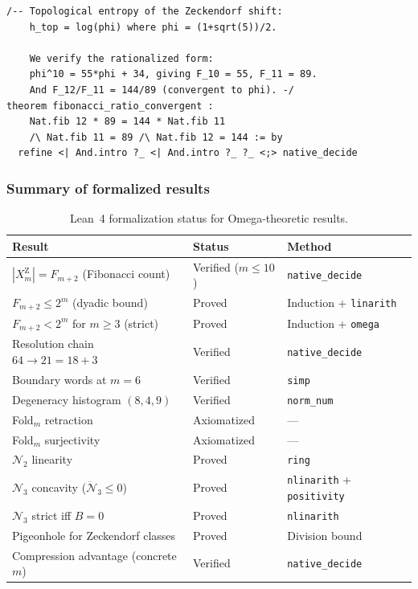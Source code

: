 \begin{lstlisting}[language=Lean4,caption={Q6 pigeonhole and compression verification}]
/-- Topological entropy of the Zeckendorf shift:
    h_top = log(phi) where phi = (1+sqrt(5))/2.

    We verify the rationalized form:
    phi^10 = 55*phi + 34, giving F_10 = 55, F_11 = 89.
    And F_12/F_11 = 144/89 (convergent to phi). -/
theorem fibonacci_ratio_convergent :
    Nat.fib 12 * 89 = 144 * Nat.fib 11
    /\ Nat.fib 11 = 89 /\ Nat.fib 12 = 144 := by
  refine <| And.intro ?_ <| And.intro ?_ ?_ <;> native_decide
\end{lstlisting}

\subsubsection*{Summary of formalized results}

\begin{table}[h]
\centering
\caption{Lean~4 formalization status for Omega-theoretic results.}
\label{tab:omega-lean}
\smallskip
\begin{tabular}{@{}lll@{}}
\toprule
\textbf{Result} & \textbf{Status} & \textbf{Method} \\
\midrule
$|X_m^{\mathrm Z}|=F_{m+2}$ (Fibonacci count)
  & Verified ($m\le 10$) & \texttt{native\_decide} \\
$F_{m+2}\le 2^m$ (dyadic bound)
  & Proved & Induction + \texttt{linarith} \\
$F_{m+2}<2^m$ for $m\ge 3$ (strict)
  & Proved & Induction + \texttt{omega} \\
Resolution chain $64\to 21=18+3$
  & Verified & \texttt{native\_decide} \\
Boundary words at $m=6$
  & Verified & \texttt{simp} \\
Degeneracy histogram $(8,4,9)$
  & Verified & \texttt{norm\_num} \\
Fold$_m$ retraction
  & Axiomatized & --- \\
Fold$_m$ surjectivity
  & Axiomatized & --- \\
$\mathcal N_2$ linearity
  & Proved & \texttt{ring} \\
$\mathcal N_3$ concavity ($\ddot{\mathcal N}_3\le 0$)
  & Proved & \texttt{nlinarith} + \texttt{positivity} \\
$\mathcal N_3$ strict iff $B=0$
  & Proved & \texttt{nlinarith} \\
Pigeonhole for Zeckendorf classes
  & Proved & Division bound \\
Compression advantage (concrete $m$)
  & Verified & \texttt{native\_decide} \\
\bottomrule
\end{tabular}
\end{table}

